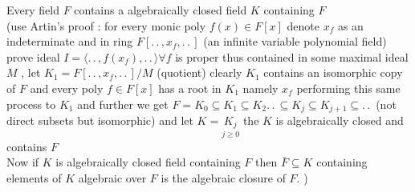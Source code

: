 \documentclass[11pt]{extarticle}
\newcommand{\ck}{.\,.\,}
\newcommand{\snote}[1]{{\footnotesize(#1)}}
\newcommand{\gen}[1]{\langle #1 \rangle}
\newcommand{\tbx}[2][]{
\begin{tcolorbox}[enhanced,breakable,size=small,colback=black!2!white,title={#1},arc is angular, arc=1.5mm,drop fuzzy shadow]
	#2
\end{tcolorbox}
}
\begin{document}
\begin{multicols}{2}
\tbx[Existence of Algebraic closure]{ Every field $ F $ contains a algebraically  closed field $ K $ containing $ F $ \\
\snote{use Artin's proof : for every monic poly $ f(x)\in  F[x]$ denote $ x_f $ as an indeterminate and in ring $ F[\ck,
x_f,\ck] $ (an infinite variable polynomial field) prove ideal $ I=\gen{\ck,f(x_f),\ck} \forall f$ is proper thus contained in some maximal ideal $ M $ , let $ K_1 =F[\ck , x_f,\ck ]/M$ (quotient) clearly $ K_1 $ contains an isomorphic copy of $ F $ and every poly $ f \in F[x]$ has a root  in $ K_1 $ namely $ x_f $ performing this same process to $ K_1 $ and further we get $ F=K_0\subseteq K_1 \subseteq K_2 \ck \subseteq K_j \subseteq K_{j+1} \subseteq\ck  $ (not direct subsets but isomorphic) and let $ K= \underset{j\geq 0}{K_j}$ the $ K $ is algebraically closed and contains $ F $ \\
Now if $ K $ is algebraically closed field containing $ F $ then $ \bar{F} \subseteq K$ containing elements of $ K $ algebraic over $ F$ is the algebraic closure of $ F.$  }}

\end{multicols}
\end{document}
